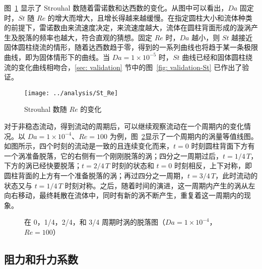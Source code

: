 图~\ref{fig: St} 显示了 Strouhal 数随着雷诺数和达西数的变化。从图中可以看出，$Da$ 固定时，$St$ 随 $Re$ 的增大而增大，且增长得越来越缓慢。在指定圆柱大小和流体种类的前提下，雷诺数由来流速度决定，来流速度越大，流体在圆柱背面形成的漩涡产生及脱落的频率也越大，符合直观的猜想。固定 $Re$ 时，$Da$ 越小，则 $St$ 越接近固体圆柱绕流的情形，随着达西数趋于零，得到的一系列曲线也将趋于某一条极限曲线，即为固体情形下的曲线。当 $Da=1 \times 10^{-5}$ 时，$St$ 曲线已经和固体圆柱绕流的变化曲线相吻合，\ref{sec: validation} 节中的图~\ref{fig: validation-St} 已作出了验证。

\begin{figure}
	\centering
	\texttt{[image: ../analysis/St\_Re]}
	\caption{Strouhal 数随 $Re$ 的变化}
	\label{fig: St}
\end{figure}

对于非稳态流动，得到流动的周期后，可以继续观察流动在一个周期内的变化情况。以 $Da=1\times 10^{-4}$、$Re=100$ 为例，图~\ref{fig: 4*vortex}显示了一个周期内的涡量等值线图。如图所示，四个时刻的流动是一致的且连续变化而来，$t=0$ 时刻圆柱背面下方有一个涡准备脱落，它的右侧有一个刚刚脱落的涡；四分之一周期过后，$t=1/4\,T$，下方的涡已经快要脱落；$t=2/4\,T$ 时刻的状态和 $t=0$ 时刻相反，上下对称，即圆柱背面的上方有一个准备脱落的涡；再过四分之一周期，$t=3/4\,T$，此时流动的状态又与 $t=1/4\,T$ 时刻对称。之后，随着时间的演进，这一周期内产生的涡从左向右移动，最终耗散在流体中，同时有新的涡不断产生，重复着这一周期内的现象。

\begin{figure}
	\centering
	\begin{minipage}{\textwidth}
		\centering
	\end{minipage}
	\centering
	\begin{minipage}{\textwidth}
		\centering
	\end{minipage}
	\caption{在 0，1/4，2/4，和 3/4 周期时涡的脱落图（$Da=1\times 10^{-4}$，$Re=100$）}
	\label{fig: 4*vortex}
\end{figure}

\subsection{阻力和升力系数}

